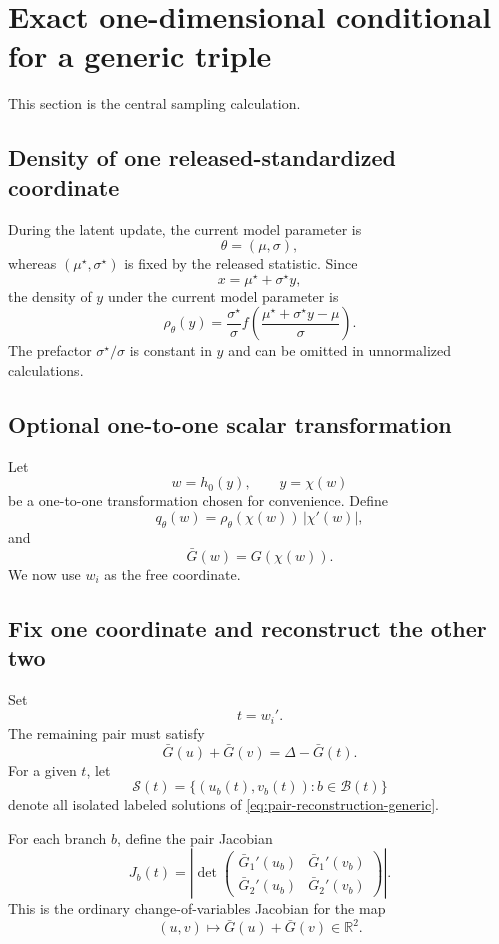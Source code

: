 \documentclass[11pt]{article}
\newcommand{\R}{\mathbb{R}}
\newcommand{\1}{\mathbf{1}}
\begin{document}
\section{Exact one-dimensional conditional for a generic triple}
\label{sec:generic-sampling}

This section is the central sampling calculation.

\subsection{Density of one released-standardized coordinate}

During the latent update, the current model parameter is
\[
    \theta=(\mu,\sigma),
\]
whereas $(\mu^\star,\sigma^\star)$ is fixed by the released statistic.  Since
\[
    x=\mu^\star+\sigma^\star y,
\]
the density of $y$ under the current model parameter is
\begin{equation}
\boxed{
    \rho_\theta(y)
    =\frac{\sigma^\star}{\sigma}
      f\!\left(
      \frac{\mu^\star+\sigma^\star y-\mu}{\sigma}
      \right).
}
\label{eq:rho-y}
\end{equation}
The prefactor $\sigma^\star/\sigma$ is constant in $y$ and can be omitted in unnormalized calculations.

\subsection{Optional one-to-one scalar transformation}

Let
\[
    w=h_0(y),\qquad y=\chi(w)
\]
be a one-to-one transformation chosen for convenience.  Define
\[
    q_\theta(w)
    =\rho_\theta(\chi(w))\,|\chi'(w)|,
\]
and
\[
    \bar G(w)=G(\chi(w)).
\]
We now use $w_i$ as the free coordinate.

\subsection{Fix one coordinate and reconstruct the other two}

Set
\[
    t=w_i'.
\]
The remaining pair must satisfy
\begin{equation}
    \bar G(u)+\bar G(v)
    =\Delta-\bar G(t).
\label{eq:pair-reconstruction-generic}
\end{equation}
For a given $t$, let
\[
    \mathcal S(t)
    =\{(u_b(t),v_b(t)):b\in\mathcal B(t)\}
\]
denote all isolated labeled solutions of \eqref{eq:pair-reconstruction-generic}.

For each branch $b$, define the pair Jacobian
\begin{equation}
\boxed{
    J_b(t)
    =
    \left|
    \det
    \begin{pmatrix}
        \bar G_1'(u_b) & \bar G_1'(v_b)\\
        \bar G_2'(u_b) & \bar G_2'(v_b)
    \end{pmatrix}
    \right|.
}
\label{eq:pair-jac}
\end{equation}
This is the ordinary change-of-variables Jacobian for the map
\[
    (u,v)\mapsto \bar G(u)+\bar G(v)\in\R^2.
\]
\end{document}
